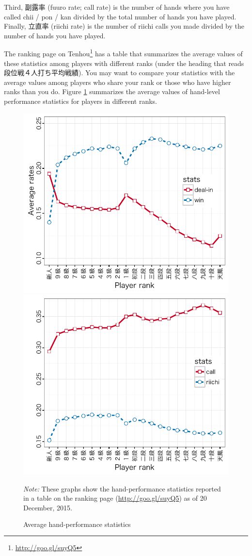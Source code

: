 \bigskip
Third, 副露率 ({\jap fuuro} rate; call rate) is the number of hands where you have called {\jap chii} / {\jap pon} / {\jap kan} divided by the total number of hands you have played. Finally, 立直率 (riichi rate) is the number of riichi calls you made divided by the number of hands you have played. 

\bigskip

The ranking page on {\jap Tenhou}\footnote{\url{http://goo.gl/suyQ5}} has a table that summarizes the average values of these statistics among players with different ranks (under the heading that reads 段位戦４人打ち平均戦績). You may want to compare your statistics with the average values among players who share your rank or those who have higher ranks than you do. Figure \ref{fig:avg} summarizes the average values of hand-level performance statistics for players in different ranks. 

\begin{figure}[t!] \captionsetup{font=small}
\begin{center}
\includegraphics[width=.50\textwidth,clip]{figs/stats_wd.pdf}\hspace{-7pt}
\includegraphics[width=.50\textwidth,clip]{figs/stats_cr.pdf}
\vspace{-10pt}
\caption{Average hand-performance statistics}\label{fig:avg}
\end{center}\vspace{-10pt}
{\footnotesize \textit{Note:} These graphs show the hand-performance statistics reported in a table on the ranking page (\url{http://goo.gl/suyQ5}) as of 20 December, 2015.}
\end{figure}

